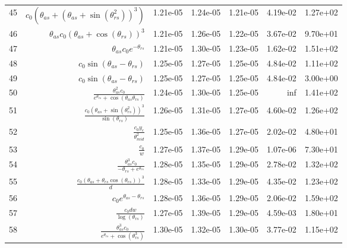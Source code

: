 \begin{tabularx}{\textwidth}{lRRRRRl}
45  &  $ c_{0} \left(\theta_{as} + \left(\theta_{as} + \sin{\left(\theta_{rs}^{2} \right)}\right)^{3}\right) $  &  1.21e-05  &  1.24e-05  &  1.21e-05  &  4.19e-02  &  1.27e+02  \\ 
46  &  $ \theta_{as} c_{0} \left(\theta_{as} + \cos{\left(\theta_{rs} \right)}\right)^{3} $  &  1.21e-05  &  1.26e-05  &  1.22e-05  &  3.67e-02  &  9.70e+01  \\ 
47  &  $ \theta_{as} c_{0} e^{- \theta_{rs}} $  &  1.21e-05  &  1.30e-05  &  1.23e-05  &  1.62e-02  &  1.51e+02  \\ 
48  &  $ c_{0} \sin{\left(\theta_{as} - \theta_{rs} \right)} $  &  1.25e-05  &  1.27e-05  &  1.25e-05  &  4.84e-02  &  1.11e+02  \\ 
49  &  $ c_{0} \sin{\left(\theta_{as} - \theta_{rs} \right)} $  &  1.25e-05  &  1.27e-05  &  1.25e-05  &  4.84e-02  &  3.00e+00  \\ 
50  &  $ \displaystyle\frac{\theta_{as}^{2} c_{0}}{e^{\theta_{rs}} + \cos{\left(\theta_{as} \theta_{rs} \right)}} $  &  1.24e-05  &  1.30e-05  &  1.25e-05  &  inf  &  1.41e+02  \\ 
51  &  $ \displaystyle\frac{c_{0} \left(\theta_{as} + \sin{\left(\theta_{rs}^{2} \right)}\right)^{3}}{\sin{\left(\theta_{rs} \right)}} $  &  1.26e-05  &  1.31e-05  &  1.27e-05  &  4.60e-02  &  1.26e+02  \\ 
52  &  $ \displaystyle\frac{c_{0} y_c}{\theta_{mid}^{2}} $  &  1.25e-05  &  1.36e-05  &  1.27e-05  &  2.02e-02  &  4.80e+01  \\ 
53  &  $ \displaystyle\frac{c_{0}}{w} $  &  1.27e-05  &  1.37e-05  &  1.29e-05  &  1.07e-06  &  7.30e+01  \\ 
54  &  $ \displaystyle\frac{\theta_{as}^{3} c_{0}}{- \theta_{rs} + e^{\theta_{rs}}} $  &  1.28e-05  &  1.35e-05  &  1.29e-05  &  2.78e-02  &  1.32e+02  \\ 
55  &  $ \displaystyle\frac{c_{0} \left(\theta_{as} + \theta_{rs} \cos{\left(\theta_{rs} \right)}\right)^{3}}{d} $  &  1.28e-05  &  1.33e-05  &  1.29e-05  &  4.35e-02  &  1.23e+02  \\ 
56  &  $ c_{0} e^{\theta_{as} - \theta_{rs}} $  &  1.28e-05  &  1.36e-05  &  1.29e-05  &  2.06e-02  &  1.59e+02  \\ 
57  &  $ \displaystyle\frac{c_{0} d w}{\log{\left(\theta_{rs} \right)}} $  &  1.27e-05  &  1.39e-05  &  1.29e-05  &  4.59e-03  &  1.80e+01  \\ 
58  &  $ \displaystyle\frac{\theta_{as}^{3} c_{0}}{e^{\theta_{rs}} + \cos{\left(\theta_{rs}^{3} \right)}} $  &  1.30e-05  &  1.32e-05  &  1.30e-05  &  3.77e-02  &  1.15e+02  \\ 

\end{tabularx}
